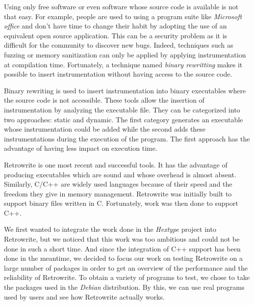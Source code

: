 \documentclass[a4paper,11pt,oneside]{report}
\newcommand{\sysname}{Retrowrite\xspace}
\begin{document}
%
Using only free software or even software whose source code is available is
not that easy. For example, people are used to using a program suite like
\textit{Microsoft office} and don't have time to change their habit by adopting
the use of an equivalent open source application.  This can be a security
problem as it is difficult for the community to discover new bugs. Indeed,
techniques such as fuzzing or memory sanitization can only be applied by
applying instrumentation at compilation time. Fortunately, a technique named
\textit{binary rewritting} makes it possible to insert instrumentation without
having access to the source code.

Binary rewriting is  used to insert instrumentation into
binary executables where the source code is not accessible. These tools allow
the insertion of instrumentation by analyzing the executable file. They can be
categorized into two approaches: static and dynamic. The first category
generates an executable whose instrumentation could be added while the second
adds these instrumentations during the execution of the program. The first
approach has the advantage of having less impact on execution time. 

Retrowrite is one most recent and successful tools. It has the advantage of
producing executables which are sound and whose overhead is almost absent.
Similarly, C/C++ are widely used languages because of their speed and the
freedom they give in memory management. Retrowrite was initially built to
support binary files written in C. Fortunately, work was then done to support
C++.


We first wanted to integrate the work done in the \textit{Hextype} project into
\sysname, but we noticed that this work was too ambitious and could not be done in
such a short time. And since the integration of C++ support has been done in
the meantime, we decided to focus our work on testing \sysname on a large
number of packages in order to get an overview of the performance and the
reliability of \sysname. To obtain a variety of programs to test, we chose to
take the packages used in the \textit{Debian} distribution. By this, we can use
real programs used by users and see how \sysname actually works.
\end{document}
